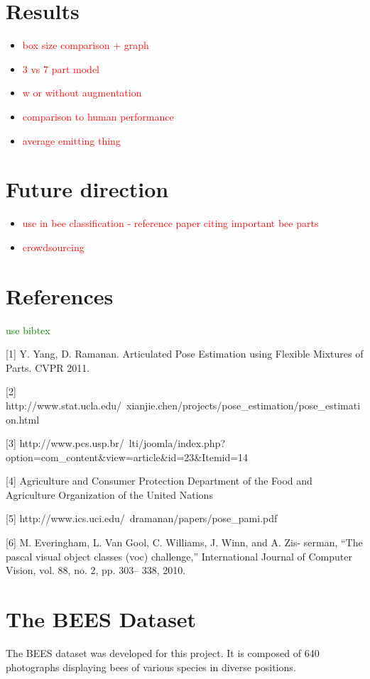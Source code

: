 \documentclass[11pt, oneside]{report}
\newcommand{\comment}[1]{\textcolor{red}{#1}}
\newcommand{\pcomment}[1]{\textcolor{green}{#1}}
\begin{document}
\chapter{Results}
    \begin{itemize}
    \item
        \comment{box size comparison + graph}
    \item
        \comment{3 vs 7 part model}
    \item
        \comment{w or without augmentation}
    \item
        \comment{comparison to human performance}
    \item
        \comment{average emitting thing}
    \end{itemize}

\chapter{Future direction}
    \begin{itemize}
    \item
        \comment{use in bee classification - reference paper citing important bee parts}
    \item
        \comment{crowdsourcing}
    \end{itemize}

\chapter{References}
\pcomment{use bibtex}

[1] Y. Yang, D. Ramanan. Articulated Pose Estimation using Flexible Mixtures of Parts. CVPR 2011.

[2] http://www.stat.ucla.edu/~xianjie.chen/projects/pose\_estimation/pose\_estimation.html

[3] http://www.pcs.usp.br/~lti/joomla/index.php?option=com\_content\&view=article\&id=23\&Itemid=14

[4] Agriculture and Consumer Protection Department of the Food and Agriculture Organization of the United Nations

[5] http://www.ics.uci.edu/~dramanan/papers/pose\_pami.pdf

[6] M. Everingham, L. Van Gool, C. Williams, J. Winn, and A. Zis- serman, “The pascal visual object classes (voc) challenge,”
International Journal of Computer Vision, vol. 88, no. 2, pp. 303–
338, 2010.



\appendix
\chapter{The BEES Dataset}
    The BEES dataset was developed for this project. It is composed of 640 photographs displaying bees of various species in diverse positions.
\end{document}
